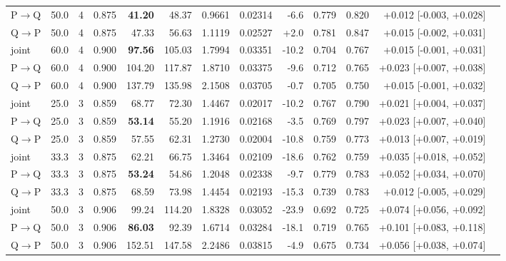 \documentclass{article}
\begin{document}
\begin{longtable}{llrrrrrrrrrrl}
P$\to$Q & 50.0 & 4 & 0.875 & \textbf{41.20} & 48.37 & 0.9661 & 0.02314 & -6.6 & 0.779 & 0.820 & +0.012 [-0.003, +0.028] \\
Q$\to$P & 50.0 & 4 & 0.875 & 47.33 & 56.63 & 1.1119 & 0.02527 & +2.0 & 0.781 & 0.847 & +0.015 [-0.002, +0.031] \\
joint & 60.0 & 4 & 0.900 & \textbf{97.56} & 105.03 & 1.7994 & 0.03351 & -10.2 & 0.704 & 0.767 & +0.015 [-0.001, +0.031] \\
P$\to$Q & 60.0 & 4 & 0.900 & 104.20 & 117.87 & 1.8710 & 0.03375 & -9.6 & 0.712 & 0.765 & +0.023 [+0.007, +0.038] \\
Q$\to$P & 60.0 & 4 & 0.900 & 137.79 & 135.98 & 2.1508 & 0.03705 & -0.7 & 0.705 & 0.750 & +0.015 [-0.001, +0.032] \\
joint & 25.0 & 3 & 0.859 & 68.77 & 72.30 & 1.4467 & 0.02017 & -10.2 & 0.767 & 0.790 & +0.021 [+0.004, +0.037] \\
P$\to$Q & 25.0 & 3 & 0.859 & \textbf{53.14} & 55.20 & 1.1916 & 0.02168 & -3.5 & 0.769 & 0.797 & +0.023 [+0.007, +0.040] \\
Q$\to$P & 25.0 & 3 & 0.859 & 57.55 & 62.31 & 1.2730 & 0.02004 & -10.8 & 0.759 & 0.773 & +0.013 [+0.007, +0.019] \\
joint & 33.3 & 3 & 0.875 & 62.21 & 66.75 & 1.3464 & 0.02109 & -18.6 & 0.762 & 0.759 & +0.035 [+0.018, +0.052] \\
P$\to$Q & 33.3 & 3 & 0.875 & \textbf{53.24} & 54.86 & 1.2048 & 0.02338 & -9.7 & 0.779 & 0.783 & +0.052 [+0.034, +0.070] \\
Q$\to$P & 33.3 & 3 & 0.875 & 68.59 & 73.98 & 1.4454 & 0.02193 & -15.3 & 0.739 & 0.783 & +0.012 [-0.005, +0.029] \\
joint & 50.0 & 3 & 0.906 & 99.24 & 114.20 & 1.8328 & 0.03052 & -23.9 & 0.692 & 0.725 & +0.074 [+0.056, +0.092] \\
P$\to$Q & 50.0 & 3 & 0.906 & \textbf{86.03} & 92.39 & 1.6714 & 0.03284 & -18.1 & 0.719 & 0.765 & +0.101 [+0.083, +0.118] \\
Q$\to$P & 50.0 & 3 & 0.906 & 152.51 & 147.58 & 2.2486 & 0.03815 & -4.9 & 0.675 & 0.734 & +0.056 [+0.038, +0.074] \\
\bottomrule\end{longtable}
\end{document}
